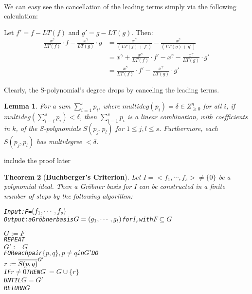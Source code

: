 \documentclass{article}
\newtheorem{theorem}{Theorem}[section]
\newtheorem{lemma}[theorem]{Lemma}
\theoremstyle{definition}
\theoremstyle{remark}
\theoremstyle{example}
\begin{document}
\paragraph{  }
We can easy see the cancellation of the leading terms simply via the following calculation:

Let $f' = f - LT(f)$ and $g' = g - LT(g)$. Then:
\begin{align}
    \tfrac{x^{\gamma}}{LT(f)} \cdot f - \tfrac{x^{\gamma}}{LT(g)} \cdot g &= \tfrac{x^{\gamma}}{(LT(f) + f')} - \tfrac{x^{\gamma}}{(LT(g) + g')}\\
    &= x^{\gamma} + \tfrac{x^{\gamma}}{LT(f)} \cdot f' - x^{\gamma} - \tfrac{x^{\gamma}}{LT(g)} \cdot g'\\
    &= \tfrac{x^{\gamma}}{LT(f)} \cdot f' - \tfrac{x^{\gamma}}{LT(g)} \cdot g' 
\end{align}

Clearly, the S-polynomial's degree drops by canceling the leading terms.

\begin{lemma}
    For a sum $\sum_{i = 1}^{s}{p_i}$, where $multideg(p_i) = \delta \in Z_{\geq0}^{n}$ for all $i$, if $multideg(\sum_{i = i}^{s}{p_i}) < \delta$, then $\sum_{i = 1}^{s}{p_i}$ is a linear combination, with coefficients in $k$, of the S-polynomials $S(p_j, p_l)$ for $1 \leq j,l \leq s$. Furthermore, each $S(p_j, p_l)$ has multidegree $< \delta$.
\end{lemma}

\textcolor{BrickRed}{include the proof later}

\begin{theorem}[\textbf{Buchberger's Criterion}]
    Let $I = <f_1,\cdots,f_s>\neq \{0\}$ be a polynomial ideal. Then a Gröbner basis for I can be constructed in a finite number of steps by the following algorithm:
    \begin{algorithm}[H]
        \caption{Buchberger's Criterion}\label{alg:bc}
        \begin{alltt}
        Input: F = \((f\sb{1},\cdots,f\sb{s})\)
        Output: a Gröbner basis \(G=(g\sb{1},\cdots,g\sb{t})\) for \(I\), with \(F \subseteq G\)
        
        \(G:=F\)
        REPEAT
        \quad \quad \quad \(G':=G\)
        \quad \quad \quad FOR each pair\(\{p,q\}, p \neq q\) in \(G'\) DO
        \quad \quad \quad \quad \quad \quad \(r := {\overline{S(p,q)}}\sp{G'}\)
        \quad \quad \quad \quad \quad \quad IF \(r\neq 0\) THEN \(G\:=G\cup\{r\}\)
        UNTIL \(G=G'\)
        RETURN \(G\)
    \end{alltt}
    \end{algorithm}
\end{theorem}
\end{document}
